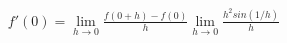 \documentclass[preview]{standalone}
\begin{document}
\begin{align*}
f'(0) = \lim_{h\to 0} \frac{f(0+h)-f(0)}{h} \lim_{h\to 0} \frac{h^{2}sin(1/h)}{h}
\end{align*}
\end{document}
